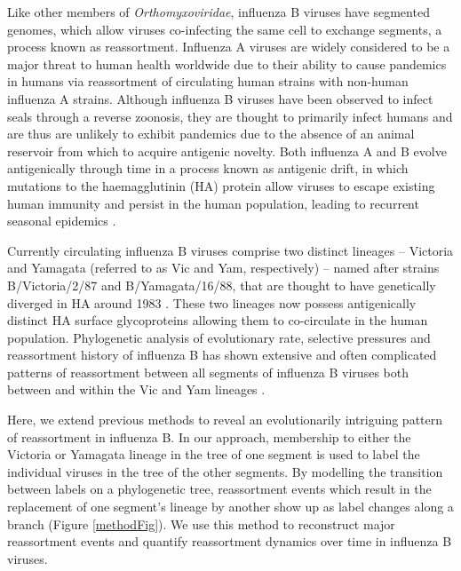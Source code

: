 \documentclass[11pt,oneside,letterpaper]{article}
\begin{document}
Like other members of \textit{Orthomyxoviridae}, influenza B viruses have segmented genomes, which allow viruses co-infecting the same cell to exchange segments, a process known as reassortment. 
Influenza A viruses are widely considered to be a major threat to human health worldwide due to their ability to cause pandemics in humans via reassortment of circulating human strains with non-human influenza A strains. 
Although influenza B viruses have been observed to infect seals \citep{osterhaus2000,bodewes2013} through a reverse zoonosis, they are thought to primarily infect humans and are thus are unlikely to exhibit pandemics due to the absence of an animal reservoir from which to acquire antigenic novelty. 
Both influenza A and B evolve antigenically through time in a process known as antigenic drift, in which mutations to the haemagglutinin (HA) protein allow viruses to escape existing human immunity and persist in the human population, leading to recurrent seasonal epidemics \citep{burnet1955,hay2001,bedford2014}.

Currently circulating influenza B viruses comprise two distinct lineages -- Victoria and Yamagata (referred to as Vic and Yam, respectively) -- named after strains B/Victoria/2/87 and B/Yamagata/16/88, that are thought to have genetically diverged in HA around 1983 \citep{rota1990}. 
These two lineages now possess antigenically distinct HA surface glycoproteins \citep{kanegae1990,rota1990,nerome1998,nakagawa2002,ansaldi2003} allowing them to co-circulate in the human population.
Phylogenetic analysis of evolutionary rate, selective pressures and reassortment history of influenza B has shown extensive and often complicated patterns of reassortment between all segments of influenza B viruses both between and within the Vic and Yam lineages \citep{chen2008}.

Here, we extend previous methods to reveal an evolutionarily intriguing pattern of reassortment in influenza B.
In our approach, membership to either the Victoria or Yamagata lineage in the tree of one segment is used to label the individual viruses in the tree of the other segments.
By modelling the transition between labels on a phylogenetic tree, reassortment events which result in the replacement of one segment's lineage by another show up as label changes along a branch (Figure \ref{methodFig}).
We use this method to reconstruct major reassortment events and quantify reassortment dynamics over time in influenza B viruses.
\end{document}
